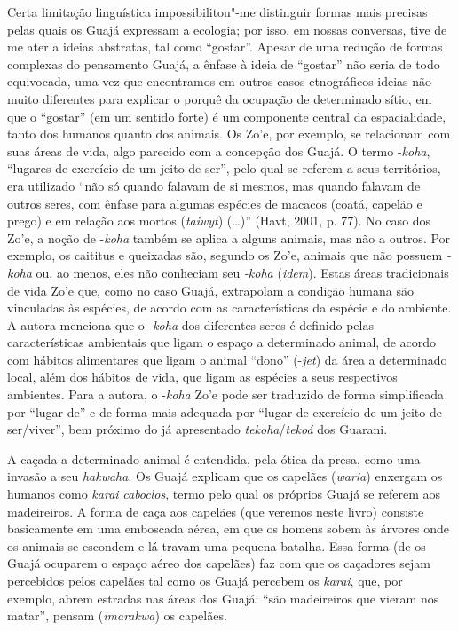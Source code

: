 Certa limitação linguística impossibilitou"-me distinguir formas mais
precisas pelas quais os Guajá expressam a ecologia; por isso, em nossas
conversas, tive de me ater a ideias abstratas, tal como ``gostar''. Apesar
de uma redução de formas complexas do pensamento Guajá, a ênfase à ideia
de ``gostar'' não seria de todo equivocada, uma vez que encontramos em
outros casos etnográficos ideias não muito diferentes para explicar o
porquê da ocupação de determinado sítio, em que o ``gostar'' (em um
sentido forte) é um componente central da espacialidade, tanto dos
humanos quanto dos animais. Os Zo'e, por exemplo, se relacionam com suas
áreas de vida, algo parecido com a concepção dos Guajá. O termo
-\emph{koha}, ``lugares de exercício de um jeito de ser'', pelo qual se
referem a seus territórios, era utilizado ``não só quando falavam de si
mesmos, mas quando falavam de outros seres, com ênfase para algumas
espécies de macacos (coatá, capelão e prego) e em relação aos mortos
(\emph{taiwyt}) (\ldots{})'' (Havt, 2001, p. 77). No caso dos Zo'e, a noção de
-\emph{koha} também se aplica a alguns animais, mas não a outros. Por
exemplo, os caititus e queixadas são, segundo os Zo'e, animais que não
possuem \emph{-koha} ou, ao menos, eles não conheciam seu \emph{-koha}
(\emph{idem}). Estas áreas tradicionais de vida Zo'e que, como no caso Guajá,
extrapolam a condição humana são vinculadas às espécies, de acordo com
as características da espécie e do ambiente. A autora menciona que o
-\emph{koha} dos diferentes seres é definido pelas características
ambientais que ligam o espaço a determinado animal, de acordo com
hábitos alimentares que ligam o animal ``dono'' (-\emph{jet}) da área a
determinado local, além dos hábitos de vida, que ligam as espécies a
seus respectivos ambientes. Para a autora, o -\emph{koha} Zo'e pode ser
traduzido de forma simplificada por ``lugar de'' e de forma mais adequada
por ``lugar de exercício de um jeito de ser/viver'', bem próximo do já
apresentado \emph{tekoha}/\emph{tekoá} dos Guarani.

A caçada a determinado animal é entendida, pela ótica da presa, como uma
invasão a seu \emph{hakwaha}. Os Guajá explicam que os capelães
(\emph{waria}) enxergam os humanos como \emph{karai} \emph{caboclos},
termo pelo qual os próprios Guajá se referem aos madeireiros. A forma de
caça aos capelães (que veremos neste livro) consiste basicamente em uma
emboscada aérea, em que os homens sobem às árvores onde os animais se
escondem e lá travam uma pequena batalha. Essa forma (de os Guajá
ocuparem o espaço aéreo dos capelães) faz com que os caçadores sejam
percebidos pelos capelães tal como os Guajá percebem os \emph{karai},
que, por exemplo, abrem estradas nas áreas dos Guajá: ``são madeireiros
que vieram nos matar'', pensam (\emph{imarakwa}) os capelães.

